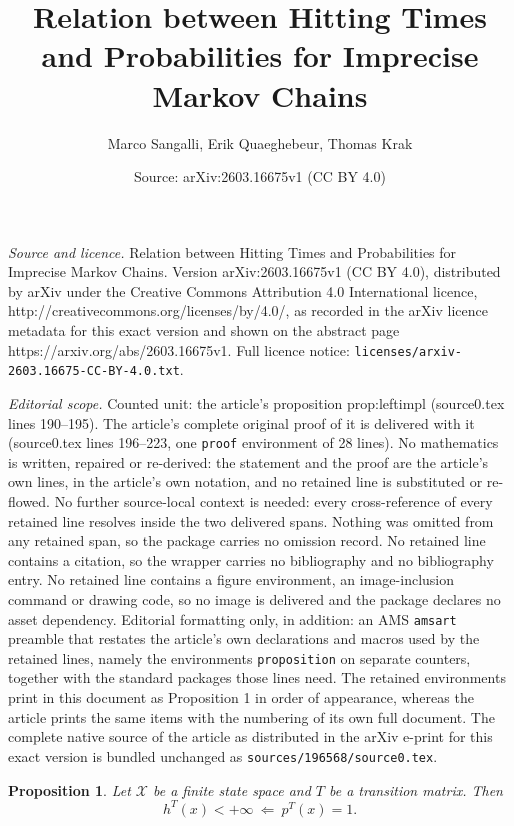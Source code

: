 \documentclass[10pt,a4paper]{amsart}
\title{Relation between Hitting Times and Probabilities for Imprecise Markov Chains}
\author{Marco Sangalli, Erik Quaeghebeur, Thomas Krak}
\date{Source: arXiv:2603.16675v1 (CC BY 4.0)}
\newtheorem{proposition}{Proposition}
\newcommand{\X}{\mathcal{X}}
\begin{document}
\maketitle

\noindent\emph{Source and licence.} Relation between Hitting Times and Probabilities for Imprecise Markov Chains. Version arXiv:2603.16675v1 (CC BY 4.0), distributed by arXiv under the Creative Commons Attribution 4.0 International licence, http://creativecommons.org/licenses/by/4.0/, as recorded in the arXiv licence metadata for this exact version and shown on the abstract page https://arxiv.org/abs/2603.16675v1. Full licence notice: \texttt{licenses/arxiv-2603.16675-CC-BY-4.0.txt}.\par\smallskip

\noindent\textit{Editorial scope.} Counted unit: the article's proposition prop:leftimpl (source0.tex lines 190--195). The article's complete original proof of it is delivered with it (source0.tex lines 196--223, one \texttt{proof} environment of 28 lines). No mathematics is written, repaired or re-derived: the statement and the proof are the article's own lines, in the article's own notation, and no retained line is substituted or re-flowed.  No further source-local context is needed: every cross-reference of every retained line resolves inside the two delivered spans.  Nothing was omitted from any retained span, so the package carries no omission record.  No retained line contains a citation, so the wrapper carries no bibliography and no bibliography entry.  No retained line contains a figure environment, an image-inclusion command or drawing code, so no image is delivered and the package declares no asset dependency.  Editorial formatting only, in addition: an AMS \texttt{amsart} preamble that restates the article's own declarations and macros used by the retained lines, namely the environments \texttt{proposition} on separate counters, together with the standard packages those lines need.  The retained environments print in this document as Proposition 1 in order of appearance, whereas the article prints the same items with the numbering of its own full document.  The complete native source of the article as distributed in the arXiv e-print for this exact version is bundled unchanged as \texttt{sources/196568/source0.tex}.
\begin{proposition}\label{prop:leftimpl}
    Let $\X$ be a finite state space and $T$ be a transition matrix. Then 
    \begin{equation}
        h^T(x)<+\infty \ \Leftarrow \ p^T(x)=1.
    \end{equation}
\end{proposition}
\end{document}
